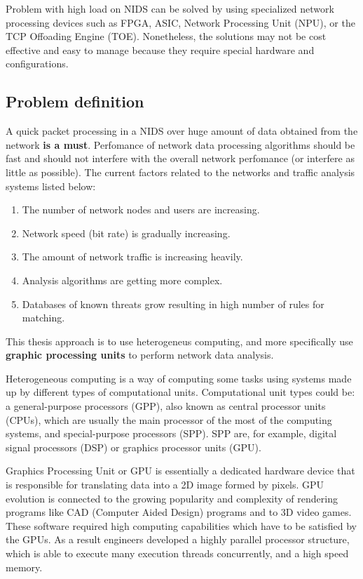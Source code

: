 \documentclass[thesis=M,english]{FITthesis}[2011/07/15]
\begin{document}
Problem with high load on NIDS can be solved by using specialized network processing devices such as FPGA, ASIC, Network Processing Unit (NPU), or the TCP Offoading Engine (TOE). Nonetheless, the solutions may not be cost effective and easy to manage because they require special hardware and configurations.

\subsection*{Problem definition}
A quick packet processing in a NIDS over huge amount of data obtained from the network \textbf{is a must}. Perfomance of network data processing algorithms should be fast and should not interfere with the overall network perfomance (or interfere as little as possible).
The current factors related to the networks and traffic analysis systems listed below:
\begin{enumerate}
\item The number of network nodes and users are increasing. 
\item Network speed (bit rate) is gradually increasing.
\item The amount of network traffic is increasing heavily.
\item Analysis algorithms are getting more complex.
\item Databases of known threats grow resulting in high number of rules for matching.
\end{enumerate}

This thesis approach is to use heterogeneus computing, and more specifically use \textbf{graphic processing units} to perform network data analysis.

Heterogeneous computing is a way of computing some tasks using systems made up by different types of computational units. Computational unit types could be: a general-purpose processors (GPP), also known as central processor units (CPUs), which are usually the main processor of the most of the computing systems, and special-purpose processors (SPP). SPP are, for example, digital signal processors (DSP) or graphics processor units (GPU).

Graphics Processing Unit or GPU is essentially a dedicated hardware device that is responsible for translating data into a 2D image formed by pixels. GPU evolution is connected to the growing popularity and complexity of rendering programs like CAD (Computer Aided Design) programs and to 3D video games. These software required high computing capabilities which have to be satisfied by the GPUs. As a result engineers developed a highly parallel processor structure, which is able to execute many execution threads concurrently, and a high speed memory.
\end{document}

